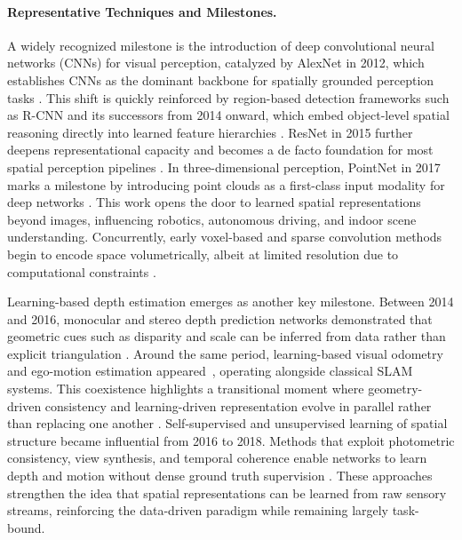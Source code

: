 \paragraph{Representative Techniques and Milestones.}
A widely recognized milestone is the introduction of deep convolutional neural networks (CNNs) for visual perception, catalyzed by AlexNet in 2012, which establishes CNNs as the dominant backbone for spatially grounded perception tasks \cite{krizhevsky2012imagenet,rawat2017deep}.
This shift is quickly reinforced by region-based detection frameworks such as R-CNN and its successors from 2014 onward, which embed object-level spatial reasoning directly into learned feature hierarchies \cite{ren2015faster,he2017mask}.
ResNet in 2015 further deepens representational capacity and becomes a de facto foundation for most spatial perception pipelines \cite{he2016deep}.
In three-dimensional perception, PointNet in 2017 marks a milestone by introducing point clouds as a first-class input modality for deep networks \cite{qi2017pointnet}.
This work opens the door to learned spatial representations beyond images, influencing robotics, autonomous driving, and indoor scene understanding.
Concurrently, early voxel-based and sparse convolution methods begin to encode space volumetrically, albeit at limited resolution due to computational constraints \cite{tang2020searching}.




Learning-based depth estimation emerges as another key milestone.
Between 2014 and 2016, monocular and stereo depth prediction networks demonstrated that geometric cues such as disparity and scale can be inferred from data rather than explicit triangulation \cite{eigen2014depth}.
Around the same period, learning-based visual odometry~\cite{Wang2017DeepVO} and ego-motion estimation appeared~\cite{tateno2017cnn}, operating alongside classical SLAM systems.
This coexistence highlights a transitional moment where geometry-driven consistency and learning-driven representation evolve in parallel rather than replacing one another \cite{Wang2017DeepVO,tang2018ba}.
Self-supervised and unsupervised learning of spatial structure became influential from 2016 to 2018.
Methods that exploit photometric consistency, view synthesis, and temporal coherence enable networks to learn depth and motion without dense ground truth supervision \cite{zhou2017unsupervised,godard2019digging}.
These approaches strengthen the idea that spatial representations can be learned from raw sensory streams, reinforcing the data-driven paradigm while remaining largely task-bound.





